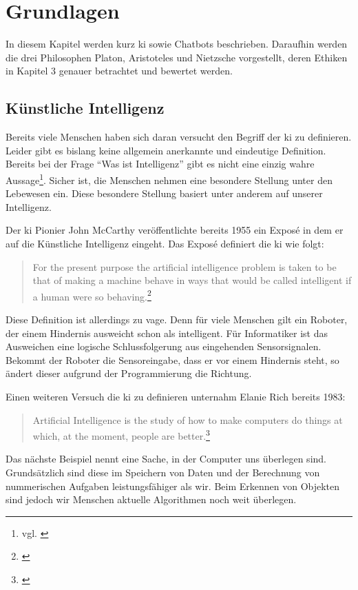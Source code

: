 \section{Grundlagen}
In diesem Kapitel werden kurz \ac{ki} sowie Chatbots beschrieben.
Daraufhin werden die drei Philosophen Platon, Aristoteles und Nietzsche vorgestellt, deren Ethiken in Kapitel 3 genauer betrachtet und bewertet werden.

\subsection{Künstliche Intelligenz}
Bereits viele Menschen haben sich daran versucht den Begriff der \ac{ki} zu definieren. Leider gibt es bislang keine allgemein anerkannte und eindeutige Definition. Bereits bei der Frage \enquote{Was ist Intelligenz} gibt es nicht eine einzig wahre Aussage\footnote{vgl. \cite{Intelligenz}}. Sicher ist, die Menschen nehmen eine besondere Stellung unter den Lebewesen ein. Diese besondere Stellung basiert unter anderem auf unserer Intelligenz. 

Der \ac{ki} Pionier John McCarthy veröffentlichte bereits 1955 ein Exposé in dem er auf die Künstliche Intelligenz eingeht. Das Exposé definiert die \ac{ki} wie folgt:
\begin{quote}
		\glqq For the present purpose the artificial intelligence problem is taken to be that of making a machine behave in ways that would be called intelligent if a human were so behaving\grqq.\footnote{\cite{PROPOSALMcCarthy}}
\end{quote}
Diese Definition ist allerdings zu vage. Denn für viele Menschen gilt ein Roboter, der einem Hindernis ausweicht schon als intelligent. Für Informatiker ist das Ausweichen eine logische Schlussfolgerung aus eingehenden Sensorsignalen. Bekommt der Roboter die Sensoreingabe, dass er vor einem Hindernis steht, so ändert dieser aufgrund der Programmierung die Richtung.

Einen weiteren Versuch die \ac{ki} zu definieren unternahm Elanie Rich bereits 1983:
\begin{quote}
	 \glqq Artificial Intelligence is the study of how to make computers do things at which, at the moment, people are better\grqq.\footnote{\cite{ArtificialIntelligence}}
\end{quote}

Das nächste Beispiel nennt eine \glqq Sache\grqq , in der Computer uns überlegen sind. 
Grundsätzlich sind diese im Speichern von Daten und der Berechnung von nummerischen Aufgaben leistungsfähiger als wir. 
Beim Erkennen von Objekten sind jedoch wir Menschen aktuelle Algorithmen noch weit überlegen. 


